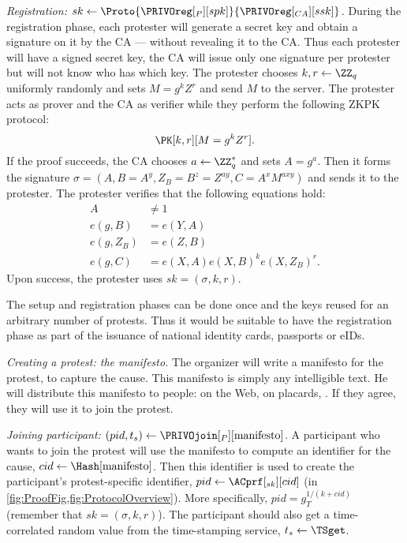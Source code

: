 
\emph{Registration: \(sk\gets 
    \Proto{\PRIVOreg[_P][spk]}{\PRIVOreg[_{CA}][ssk]}\).}
During the registration phase, each protester will generate a secret key and 
obtain a signature on it by the \ac{CA} --- without revealing it to the \ac{CA}.
Thus each protester will have a signed secret key, the \ac{CA} will issue only 
one signature per protester but will not know who has which key.
The protester chooses \(k, r\gets \ZZ_q\) uniformly randomly and sets \(M = g^k 
  Z^r\) and send \(M\) to the server.
The protester acts as prover and the \ac{CA} as verifier while they perform the 
following \ac{ZKPK} protocol:
\[
  \PK[k,r][M = g^k Z^r].
\]
If the proof succeeds, the \ac{CA} chooses \(a\gets \ZZ_q^*\) and sets \(A = 
  g^a\).
Then it forms the signature \(\sigma = (A, B = A^y, Z_B = B^z = Z^{ay}, C = A^x 
  M^{axy})\) and sends it to the protester.
The protester verifies that the following equations hold:
\begin{align*}
  A &\neq 1 \\
  e(g, B) &= e(Y, A) \\
  e(g, Z_B) &= e(Z, B) \\
  e(g, C) &= e(X, A) e(X, B)^k e(X, Z_B)^r.
\end{align*}
Upon success, the protester uses \(sk = (\sigma, k, r)\).

The setup and registration phases can be done once and the keys reused for an 
arbitrary number of protests.
Thus it would be suitable to have the registration phase as part of the issuance 
of \eg national identity cards, passports or \acp{eID}.

\emph{Creating a protest: the manifesto.}
The organizer will write a manifesto for the protest, \ie to capture the cause.
This manifesto is simply any intelligible text.
He will distribute this manifesto to people: on the Web, on placards, \etc.
If they agree, they will use it to join the protest.


\emph{Joining participant: \((pid, t_s)\gets 
    \PRIVOjoin[_P][\text{manifesto}]\).}
A participant who wants to join the protest will use the manifesto to compute an 
identifier for the cause, \(cid\gets \Hash[\text{manifesto}]\).
Then this identifier is used to create the participant's protest-specific 
identifier, \(pid\gets \ACprf[_{sk}][cid]\) (in 
\cref{fig:ProofFig,fig:ProtocolOverview}).
More specifically, \(pid = g_T^{1/(k+cid)}\) (remember that \(sk = (\sigma, k, 
  r)\)).
The participant should also get a time-correlated random value from the 
time-stamping service, \(t_s\gets \TSget\).

